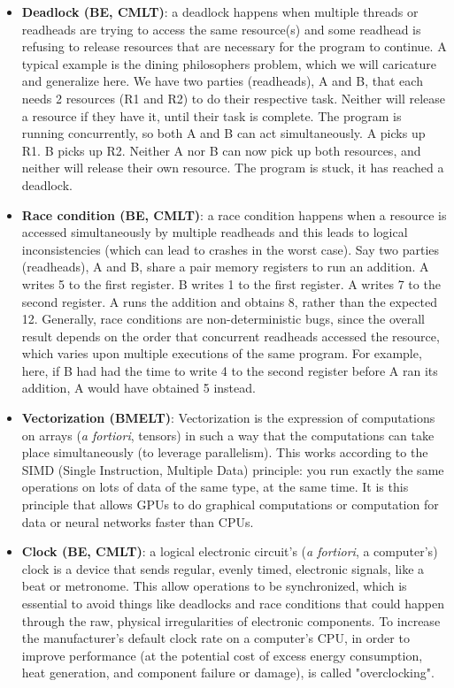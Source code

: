 \documentclass{article}
\begin{document}
\begin{itemize}
	\item \textbf{Deadlock (BE, CMLT)}: a deadlock happens when multiple threads or readheads are trying to access the same resource(s) and some readhead is refusing to release resources that are necessary for the program to continue. A typical example is the dining philosophers problem, which we will caricature and generalize here. We have two parties (readheads), A and B, that each needs 2 resources (R1 and R2) to do their respective task. Neither will release a resource if they have it, until their task is complete. The program is running concurrently, so both A and B can act simultaneously. A picks up R1. B picks up R2. Neither A nor B can now pick up both resources, and neither will release their own resource. The program is stuck, it has reached a deadlock.

	\item \textbf{Race condition (BE, CMLT)}: a race condition happens when a resource is accessed simultaneously by multiple readheads and this leads to logical inconsistencies (which can lead to crashes in the worst case). Say two parties (readheads), A and B, share a pair memory registers to run an addition. A writes 5 to the first register. B writes 1 to the first register. A writes 7 to the second register. A runs the addition and obtains 8, rather than the expected 12. Generally, race conditions are non-deterministic bugs, since the overall result depends on the order that concurrent readheads accessed the resource, which varies upon multiple executions of the same program. For example, here, if B had had the time to write 4 to the second register before A ran its addition, A would have obtained 5 instead.

	\item \textbf{Vectorization (BMELT)}: Vectorization is the expression of computations on arrays (\textit{a fortiori}, tensors) in such a way that the computations can take place simultaneously (to leverage parallelism). This works according to the SIMD (Single Instruction, Multiple Data) principle: you run exactly the same operations on lots of data of the same type, at the same time. It is this principle that allows GPUs to do graphical computations or computation for data or neural networks faster than CPUs.

	\item \textbf{Clock (BE, CMLT)}: a logical electronic circuit's (\textit{a fortiori}, a computer's) clock is a device that sends regular, evenly timed, electronic signals, like a beat or metronome. This allow operations to be synchronized, which is essential to avoid things like deadlocks and race conditions that could happen through the raw, physical irregularities of electronic components. To increase the manufacturer's default clock rate on a computer's CPU, in order to improve performance (at the potential cost of excess energy consumption, heat generation, and component failure or damage), is called "overclocking".

\end{itemize}
\end{document}
